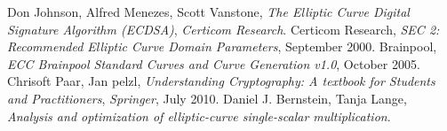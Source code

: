 \documentclass[12pt]{article}
\begin{document}
\pagebreak

\begin{thebibliography}{2} 
 Don Johnson, Alfred Menezes, Scott Vanstone, \emph{The Elliptic Curve Digital Signature Algorithm (ECDSA)}, \emph{Certicom Research}.
 Certicom Research, \emph{SEC 2: Recommended Elliptic Curve Domain Parameters}, September 2000.
 Brainpool, \emph{ECC Brainpool Standard Curves and Curve Generation v1.0}, October 2005.
 Chrisoft Paar, Jan pelzl, \emph{Understanding Cryptography: A textbook for Students and Practitioners}, \emph{Springer}, July 2010.
 Daniel J. Bernstein, Tanja Lange, \emph{Analysis and optimization of elliptic-curve single-scalar multiplication}.
\end{thebibliography}
\end{document}
